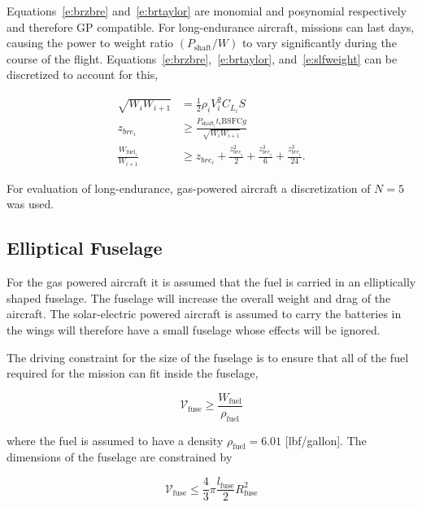     Equations~\eqref{e:brzbre} and~\eqref{e:brtaylor} are monomial and posynomial respectively and therefore GP compatible. For long-endurance aircraft, missions can last days, causing the power to weight ratio $(P_{\text{shaft}}/W)$ to vary significantly during the course of the flight.  
    Equations~\eqref{e:brzbre},~\eqref{e:brtaylor}, and~\eqref{e:slfweight} can be discretized to account for this,

\begin{align}
    \label{e:slfweightd}
    \sqrt{W_i W_{i+1}} &= \frac{1}{2} \rho_i V_i^2 C_{L_i} S \\
    \label{e:brzbred}
    z_{bre_i} &\geq \frac{P_{\text{shaft}_i}t_i \text{BSFC} g}{\sqrt{W_i W_{i+1}}}\\
    \label{e:brtaylord}
    \frac{W_{\text{fuel}_i}}{W_{i+1}} &\geq z_{bre_i} + \frac{z_{bre_i}^2}{2} + \frac{z_{bre_i}^3}{6} + \frac{z_{bre_i}^3}{24}.
    \end{align}

    For evaluation of long-endurance, gas-powered aircraft a discretization of $N=5$ was used. 

\subsection{Elliptical Fuselage}

For the gas powered aircraft it is assumed that the fuel is carried in an elliptically shaped fuselage.  The fuselage will increase the overall weight and drag of the aircraft.  The solar-electric powered aircraft is assumed to carry the batteries in the wings will therefore have a small fuselage whose effects will be ignored.  

The driving constraint for the size of the fuselage is to ensure that all of the fuel required for the mission can fit inside the fuselage, 

\begin{equation}
    \label{e:fusevol}
    \mathcal{V}_{\text{fuse}} \geq \frac{W_\text{fuel}}{\rho_\text{fuel}}
\end{equation}

where the fuel is assumed to have a density $\rho_\text{fuel} = 6.01$ [lbf/gallon].  The dimensions of the fuselage are constrained by

\begin{equation}
    \label{e:fusevol2}
    \mathcal{V}_{\text{fuse}} \leq \frac{4}{3}\pi \frac{l_{\text{fuse}}}{2}R_{\text{fuse}}^2
\end{equation}

